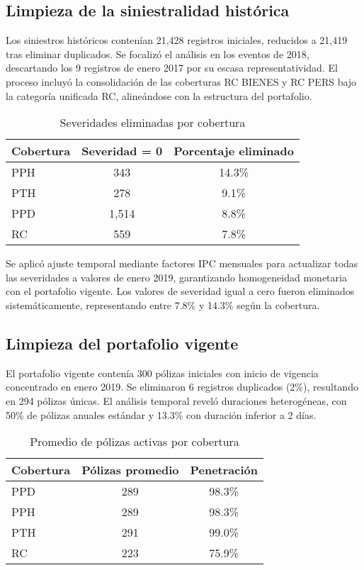 \subsection{Limpieza de la siniestralidad histórica}

Los siniestros históricos contenían 21,428 registros iniciales, reducidos a 21,419 tras eliminar duplicados. Se focalizó el análisis en los eventos de 2018, descartando los 9 registros de enero 2017 por su escasa representatividad. El proceso incluyó la consolidación de las coberturas RC BIENES y RC PERS bajo la categoría unificada RC, alineándose con la estructura del portafolio.

\begin{table}[H]
\centering
\caption{Severidades eliminadas por cobertura}
\begin{tabular}{lcc}
\hline
\textbf{Cobertura} & \textbf{Severidad = 0} & \textbf{Porcentaje eliminado} \\
\hline
PPH & 343 & 14.3\% \\
PTH & 278 & 9.1\% \\
PPD & 1,514 & 8.8\% \\
RC & 559 & 7.8\% \\
\hline
\end{tabular}
\end{table}

Se aplicó ajuste temporal mediante factores IPC mensuales para actualizar todas las severidades a valores de enero 2019, garantizando homogeneidad monetaria con el portafolio vigente. Los valores de severidad igual a cero fueron eliminados sistemáticamente, representando entre 7.8\% y 14.3\% según la cobertura.

\subsection{Limpieza del portafolio vigente}

El portafolio vigente contenía 300 pólizas iniciales con inicio de vigencia concentrado en enero 2019. Se eliminaron 6 registros duplicados (2\%), resultando en 294 pólizas únicas. El análisis temporal reveló duraciones heterogéneas, con 50\% de pólizas anuales estándar y 13.3\% con duración inferior a 2 días.

\begin{table}[H]
\centering
\caption{Promedio de pólizas activas por cobertura}
\begin{tabular}{lcc}
\hline
\textbf{Cobertura} & \textbf{Pólizas promedio} & \textbf{Penetración} \\
\hline
PPD & 289 & 98.3\% \\
PPH & 289 & 98.3\% \\
PTH & 291 & 99.0\% \\
RC & 223 & 75.9\% \\
\hline
\end{tabular}
\end{table}

